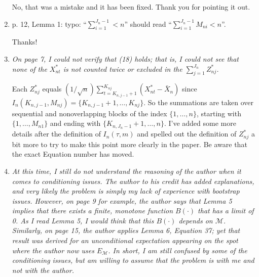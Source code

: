 \documentclass[12pt]{article}
\begin{document}
\begin{enumerate}
  No, that was a mistake and it has been fixed. Thank you for pointing
  it out.

\item p. 12, Lemma 1: typo: ``$\sum_{i=1}^{J_n-1} < n$'' should read
  ``$\sum_{i=1}^{J_n-1} M_{ni} < n$''.

  Thanks!

\item \textit{On page 7, I could not verify that (18) holds; that is,
    I could not see that none of the $X_{nt}^*$ is not counted twice
    or excluded in the $\sum_{j=1}^{J_n} Z_{nj}^*$.}

  Each $Z_{nj}^*$ equals $(1/\sqrt{n}) \sum_{t=K_{n,j-1}+1}^{K_{nj}}
  (X_{nt}^* - \bar X_n)$ since $I_n(K_{n,j-1}, M_{nj}) =
  \{K_{n,j-1}+1,\dots,K_{nj}\}$. So the summations are taken over
  sequential and nonoverlapping blocks of the index $\{1,\dots,n\}$,
  starting with $\{1,\dots,M_{n1}\}$ and ending with
  $\{K_{n,J_n-1}+1,\dots,n\}$.  I've added some more details after the
  definition of $I_n(\tau,m)$ and spelled out the
  definition of $Z_{nj}^*$ a bit more to try to make
  this point more clearly in the paper. Be aware that the exact
  Equation number has moved.

\item \textit{At this time, I still do not understand the reasoning of
    the author when it comes to conditioning issues. The author to his
    credit has added explanations, and very likely the problem is
    simply my lack of experience with bootstrap issues. However, on
    page 9 for example, the author says that Lemma 5 implies that
    there exists a finite, monotone function $B(\cdot)$ that has a
    limit of 0. As I read Lemma 5, I would think that this $B(\cdot)$
    depends on $\mathcal{M}$. Similarly, on page 15, the author
    applies Lemma 6, Equation 37; yet that result was derived for an
    unconditional expectation appearing on the spot where the author
    now uses $E_{\mathcal{M}}$. In short, I am still confused by some
    of the conditioning issues, but am willing to assume that the
    problem is with me and not with the author.}

\end{enumerate}
\end{document}
